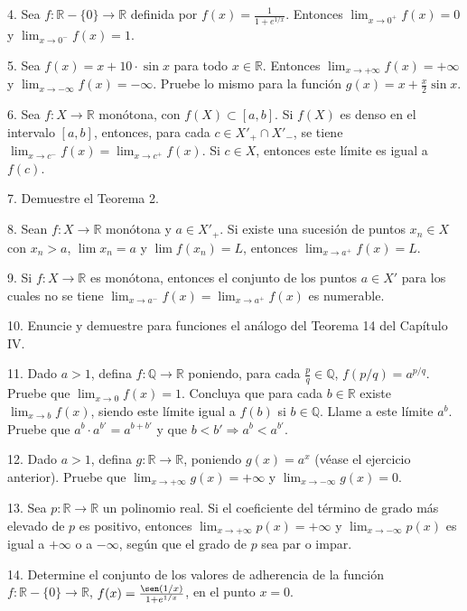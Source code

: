 \documentclass[12pt,oneside]{book}
\begin{document}
4. Sea \( f: \mathbb{R} - \{0\} \to \mathbb{R} \) definida por \( f(x) = \frac{1}{1 + e^{1/x}} \). Entonces \( \lim_{x \to 0^+} f(x) = 0 \) y \( \lim_{x \to 0^-} f(x) = 1 \).

5. Sea \( f(x) = x + 10 \cdot \sin x \) para todo \( x \in \mathbb{R} \). Entonces \( \lim_{x \to +\infty} f(x) = +\infty \) y \( \lim_{x \to -\infty} f(x) = -\infty \). Pruebe lo mismo para la función \( g(x) = x + \frac{x}{2} \sin x \).

6. Sea \( f: X \to \mathbb{R} \) monótona, con \( f(X) \subset [a, b] \). Si \( f(X) \) es denso en el intervalo \( [a, b] \), entonces, para cada \( c \in X'_+ \cap X'_- \), se tiene \( \lim_{x \to c^-} f(x) = \lim_{x \to c^+} f(x) \). Si \( c \in X \), entonces este límite es igual a \( f(c) \).

7. Demuestre el Teorema 2.

8. Sean \( f: X \to \mathbb{R} \) monótona y \( a \in X'_+ \). Si existe una sucesión de puntos \( x_n \in X \) con \( x_n > a \), \( \lim x_n = a \) y \( \lim f(x_n) = L \), entonces \( \lim_{x \to a^+} f(x) = L \).

9. Si \( f: X \to \mathbb{R} \) es monótona, entonces el conjunto de los puntos \( a \in X' \) para los cuales no se tiene \( \lim_{x \to a^-} f(x) = \lim_{x \to a^+} f(x) \) es numerable.

10. Enuncie y demuestre para funciones el análogo del Teorema 14 del Capítulo IV.

11. Dado \(a > 1\), defina \(f: \mathbb{Q} \to \mathbb{R}\) poniendo, para cada \(\frac{p}{q} \in \mathbb{Q}\), \(f(p/q) = a^{p/q}\). Pruebe que \(\lim_{x \to 0} f(x) = 1\). Concluya que para cada \(b \in \mathbb{R}\) existe \(\lim_{x \to b} f(x)\), siendo este límite igual a \(f(b)\) si \(b \in \mathbb{Q}\). Llame a este límite \(a^b\). Pruebe que \(a^b \cdot a^{b'} = a^{b+b'}\) y que \(b < b' \Rightarrow a^b < a^{b'}\).

12. Dado \(a > 1\), defina \(g: \mathbb{R} \to \mathbb{R}\), poniendo \(g(x) = a^x\) (véase el ejercicio anterior). Pruebe que \(\lim_{x \to +\infty} g(x) = +\infty\) y \(\lim_{x \to -\infty} g(x) = 0\).

13. Sea \(p: \mathbb{R} \to \mathbb{R}\) un polinomio real. Si el coeficiente del término de grado más elevado de \(p\) es positivo, entonces \(\lim_{x \to +\infty} p(x) = +\infty\) y \(\lim_{x \to -\infty} p(x)\) es igual a \(+\infty\) o a \(-\infty\), según que el grado de \(p\) sea par o impar.

14. Determine el conjunto de los valores de adherencia de la función \(f: \mathbb{R} - \{0\} \to \mathbb{R}\), \(f(x) = \frac{\sen(1/x)}{1 + e^{1/x}}\), en el punto \(x = 0\).
\end{document}
